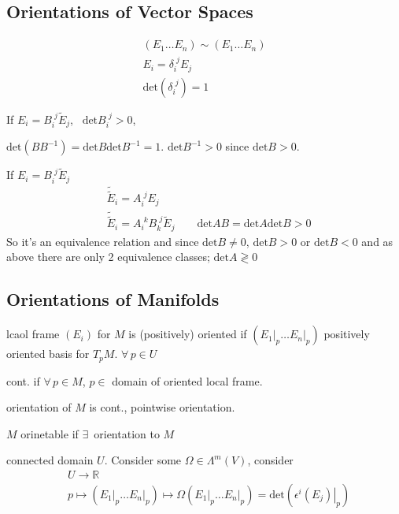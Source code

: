 \subsection*{ Orientations of Vector Spaces }

\[
\begin{gathered}
  (E_1 \dots E_n) \sim (E_1 \dots E_n) \\ 
  E_i = \delta_i^{\, \, j } E_j \\ 
  \text{det}{ (\delta_i^{\, \, j} )} = 1 
\end{gathered}
\]

If $E_i = B_i^{\, \, j} \widetilde{E}_j$, \, $\text{det}{B_i^{\, \, j }} >0$,  

$\text{det}{(BB^{-1})} = \text{det}{B} \text{det}{B^{-1}} = 1$.  $\text{det}{B^{-1}} >0$ since $\text{det}{B} >0$.  

If $E_i = B_i^{\, \, j} \widetilde{E}_j$  
\[
\begin{aligned}
  & \widetilde{ \widetilde{E}}_i = A_i^{\, \, j} E_j \\ 
  & \widetilde{ \widetilde{E}}_i = A_i^{\, \, k } B_k^{\, \, j} \widetilde{E}_j \quad \quad \text{det}{AB} = \text{det}{A} \text{det}{B} >0
\end{aligned}
\]
So it's an equivalence relation and since $\text{det}{B} \neq 0$, $\text{det}{B} >0$ or $\text{det}{B} <0$ and as above there are only 2 equivalence classes; $\text{det}{A} \gtrless 0$

\subsection*{ Orientations of Manifolds }

lcaol frame $(E_i)$ for $M$ is (positively) oriented if $(\left. E_1 \right|_p \dots \left. E_n \right|_p)$ positively oriented basis for $T_pM$.  $\forall \, p \in U$  

cont. if $\forall \, p \in M$, $p\in $ domain of oriented local frame.  

orientation of $M$ is cont., pointwise orientation.  

$M$ orinetable if $\exists \, $ orientation to $M$

  connected domain $U$.  Consider some $\Omega \in \Lambda^m(V)$,  consider 
\[
\begin{aligned}
  & U \to \mathbb{R} \\ 
  & p \mapsto ( \left. E_1 \right|_p \dots \left. E_n \right|_p ) \mapsto \Omega( \left. E_1 \right|_p \dots \left. E_n \right|_p ) = \text{det}{ ( \left.  \epsilon^i(E_j) \right|_p ) }
\end{aligned}
\]

